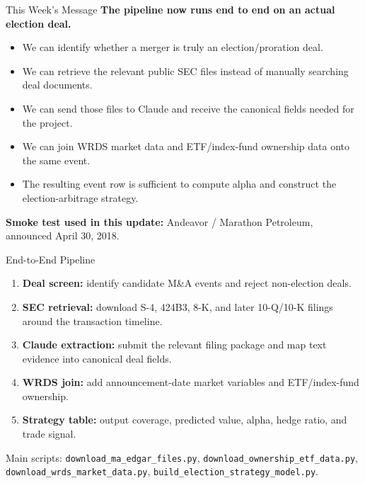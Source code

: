 \documentclass[aspectratio=169,11pt]{beamer}
\begin{document}
\begin{frame}{This Week's Message}
\small
\textbf{The pipeline now runs end to end on an actual election deal.}

\vspace{0.6em}
\begin{itemize}
  \item We can identify whether a merger is truly an election/proration deal.
  \item We can retrieve the relevant public SEC files instead of manually searching deal documents.
  \item We can send those files to Claude and receive the canonical fields needed for the project.
  \item We can join WRDS market data and ETF/index-fund ownership data onto the same event.
  \item The resulting event row is sufficient to compute alpha and construct the election-arbitrage strategy.
\end{itemize}

\vspace{0.7em}
\textbf{Smoke test used in this update:} Andeavor / Marathon Petroleum, announced April 30, 2018.
\end{frame}

\begin{frame}{End-to-End Pipeline}
\small
\begin{enumerate}
  \item \textbf{Deal screen:} identify candidate M\&A events and reject non-election deals.
  \item \textbf{SEC retrieval:} download S-4, 424B3, 8-K, and later 10-Q/10-K filings around the transaction timeline.
  \item \textbf{Claude extraction:} submit the relevant filing package and map text evidence into canonical deal fields.
  \item \textbf{WRDS join:} add announcement-date market variables and ETF/index-fund ownership.
  \item \textbf{Strategy table:} output coverage, predicted value, alpha, hedge ratio, and trade signal.
\end{enumerate}

\vspace{0.7em}
\scriptsize
Main scripts: \texttt{download\_ma\_edgar\_files.py}, \texttt{download\_ownership\_etf\_data.py}, \texttt{download\_wrds\_market\_data.py}, \texttt{build\_election\_strategy\_model.py}.
\end{frame}
\end{document}
